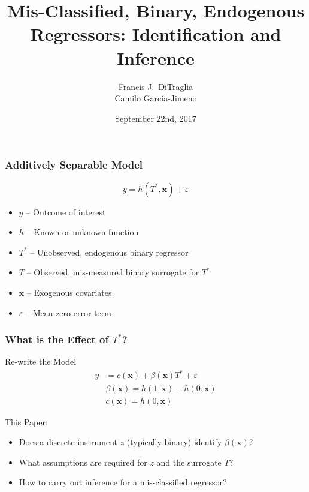 \documentclass{beamer}
\title[Binary Regressors]{Mis-Classified, Binary, Endogenous Regressors: Identification and Inference}
\author[FJ DiTraglia]{Francis J.\ DiTraglia\\ Camilo Garc\'{i}a-Jimeno}
\institute{University of Pennsylvania}
\date{September 22nd, 2017}
\begin{document}
 

\begin{frame}[plain]
	\titlepage 
\end{frame} 
\begin{frame}
  \frametitle{Additively Separable Model}
\[
  y = h(T^*, \mathbf{x}) + \varepsilon
\]
\vspace{-1em}
    \begin{itemize}    
    \item $y$ -- Outcome of interest
    \item $h$ -- Known or unknown function 
    \item $T^*$ -- Unobserved, endogenous binary regressor
    \item $T$ -- Observed, mis-measured binary surrogate for $T^*$
    \item $\mathbf{x}$ -- Exogenous covariates
    \item $\varepsilon$ -- Mean-zero error term
  \end{itemize}

\end{frame}
\begin{frame}
  \frametitle{What is the Effect of $T^*$?}
 
  \begin{block}{Re-write the Model}
\begin{align*}
  y &= c(\mathbf{x}) + \beta(\mathbf{x}) T^* + \varepsilon\\
  &\beta(\mathbf{x}) = h(1,\mathbf{x}) - h(0,\mathbf{x})\\
  &c(\mathbf{x}) = h(0,\mathbf{x})
\end{align*}
  \end{block}

  \begin{alertblock}{This Paper:}
    \begin{itemize}
      \item Does a discrete instrument $z$ (typically binary) identify $\beta(\mathbf{x})$? 
      \item What assumptions are required for $z$ and the surrogate $T$?
      \item How to carry out inference for a mis-classified regressor?
    \end{itemize}
  \end{alertblock}
\end{frame}
\end{document}
